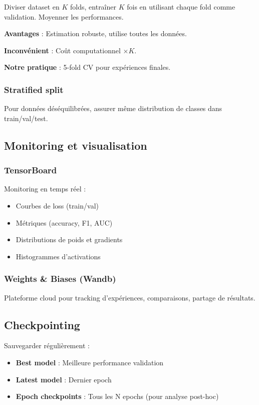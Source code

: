 Diviser dataset en $K$ folds, entraîner $K$ fois en utilisant chaque fold comme validation. Moyenner les performances.

\textbf{Avantages} : Estimation robuste, utilise toutes les données.

\textbf{Inconvénient} : Coût computationnel $\times K$.

\textbf{Notre pratique} : 5-fold CV pour expériences finales.

\subsubsection{Stratified split}

Pour données déséquilibrées, assurer même distribution de classes dans train/val/test.

\subsection{Monitoring et visualisation}

\subsubsection{TensorBoard}

Monitoring en temps réel :
\begin{itemize}
    \item Courbes de loss (train/val)
    \item Métriques (accuracy, F1, AUC)
    \item Distributions de poids et gradients
    \item Histogrammes d'activations
\end{itemize}

\subsubsection{Weights \& Biases (Wandb)}

Plateforme cloud pour tracking d'expériences, comparaisons, partage de résultats.

\subsection{Checkpointing}

Sauvegarder régulièrement :
\begin{itemize}
    \item \textbf{Best model} : Meilleure performance validation
    \item \textbf{Latest model} : Dernier epoch
    \item \textbf{Epoch checkpoints} : Tous les N epochs (pour analyse post-hoc)
\end{itemize}

